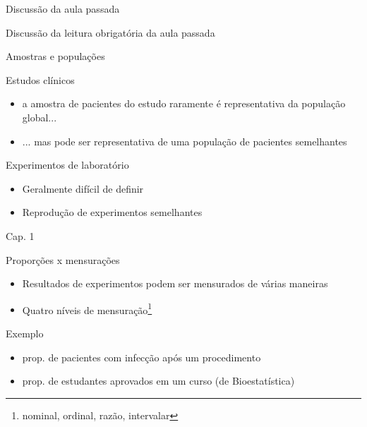 \documentclass{beamer}
\begin{document}

\begin{frame}{Discussão da aula passada}
  \begin{block}{}
    Discussão da leitura obrigatória da aula passada
  \end{block}
\end{frame}

\begin{frame}{Amostras e populações}
  \begin{block}{Estudos clínicos}
    \begin{itemize}
    \item a amostra de pacientes do estudo raramente é representativa da população global...
    \item ... mas pode ser representativa de uma população de pacientes semelhantes
    \end{itemize}
  \end{block}
  \begin{block}{Experimentos de laboratório}
    \begin{itemize}
    \item Geralmente difícil de definir
    \item Reprodução de experimentos semelhantes
    \end{itemize}
  \end{block}
\hfill Cap. 1
\end{frame}

\begin{frame}{Proporções x mensurações}
  \begin{itemize}
  \item Resultados de experimentos podem ser mensurados de várias maneiras
  \item Quatro níveis de mensuração\footnote{nominal, ordinal, razão, intervalar}
  \end{itemize}
  \begin{exampleblock}{Exemplo}
    \begin{itemize}
    \item prop. de pacientes com infecção após um procedimento
    \item prop. de estudantes aprovados em um curso (de Bioestatística)
    \end{itemize}
  \end{exampleblock}
\end{frame}
\end{document}
